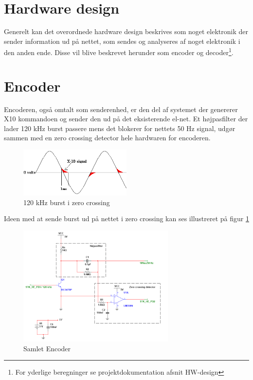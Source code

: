 \section{Hardware design}

Generelt kan det overordnede hardware design beskrives som noget elektronik der sender information ud på nettet, som sendes og analyseres af noget elektronik i den anden ende. Disse vil blive beskrevet herunder som encoder og decoder\footnote{For yderlige beregninger se projektdokumentation afsnit HW-design}.  


\section{Encoder}
Encoderen, også omtalt som senderenhed, er den del af systemet der genererer X10 kommandoen og sender den ud på det eksisterende el-net. Et højpasfilter der lader 120 kHz burst passere mens det blokerer for nettets 50 Hz signal, udgør sammen med en zero crossing detector hele hardwaren for encoderen.

\begin{figure}[htbp]
	\centering
	\includegraphics[width=0.50\textwidth]{billeder/HWdesign/X10_BURST}
	\caption{120 kHz burst i zero crossing}
	\label{fig:X10_BURST}
\end{figure}

Ideen med at sende burst ud på nettet i zero crossing kan ses illustreret på figur \ref{fig:X10_BURST}

\begin{figure}[htbp]
	\centering
	\includegraphics[width=0.70\textwidth]{billeder/HWdesign/Encoder}
	\caption{Samlet Encoder}
	\label{fig:Encoder}
\end{figure}
\newpage

